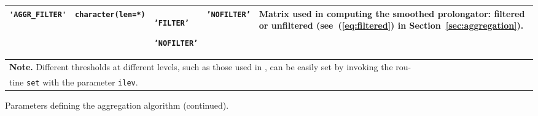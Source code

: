 \begin{center}
\begin{tabular}{|p{3.8cm}|l|p{2.5cm}|p{2.3cm}|p{6.6cm}|}
\verb|'AGGR_FILTER'|  
                         & \verb|character(len=*)|
                         & \texttt{'FILTER'} \par \texttt{'NOFILTER'}
                        & \texttt{'NOFILTER'} & Matrix used in computing the smoothed
                           prolongator: filtered or unfiltered (see~(\ref{eq:filtered}) in Section~\ref{sec:aggregation}). \\
\hline
\multicolumn{5}{|l|}{{\bfseries Note.} Different thresholds at different levels, such as
those used in \cite[Section~5.1]{VANEK_MANDEL_BREZINA}, can be easily set  by 
invoking the rou-} \\
\multicolumn{5}{|l|}{tine \texttt{set} with
the parameter \texttt{ilev}.} \\
\hline
\end{tabular}
\end{center}
\caption{Parameters defining the aggregation algorithm (continued).
\label{tab:p_aggregation_1}} 
\esideways
                     
